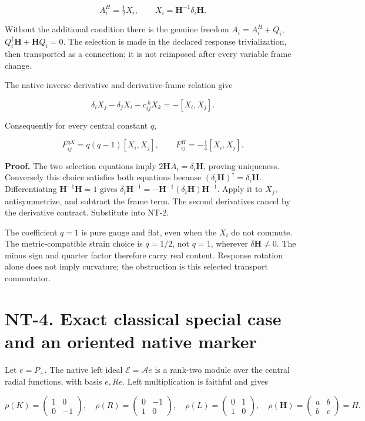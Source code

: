 \documentclass[
  11pt,
]{article}
\begin{document}
\[
\boxed{A_i^H=\tfrac12X_i,\qquad X_i=\mathbf H^{-1}\delta_i\mathbf H.}
\]

Without the additional condition there is the genuine freedom
\(A_i=A_i^H+Q_i\), \(Q_i^\dagger\mathbf H+\mathbf HQ_i=0\). The
selection is made in the declared response trivialization, then
transported as a connection; it is not reimposed after every variable
frame change.

The native inverse derivative and derivative-frame relation give

\[
\delta_iX_j-\delta_jX_i-c_{ij}^{\ k}X_k=-[X_i,X_j].
\]

Consequently for every central constant \(q\),

\[
F^{qX}_{ij}=q(q-1)[X_i,X_j],\qquad
\boxed{F^H_{ij}=-\tfrac14[X_i,X_j].}
\]

\textbf{Proof.} The two selection equations imply
\(2\mathbf HA_i=\delta_i\mathbf H\), proving uniqueness. Conversely this
choice satisfies both equations because
\((\delta_i\mathbf H)^\dagger=\delta_i\mathbf H\). Differentiating
\(\mathbf H^{-1}\mathbf H=1\) gives
\(\delta_i\mathbf H^{-1}=-\mathbf H^{-1}(\delta_i\mathbf H)\mathbf H^{-1}\).
Apply it to \(X_j\), antisymmetrize, and subtract the frame term. The
second derivatives cancel by the derivative contract. Substitute into
NT-2.

The coefficient \(q=1\) is pure gauge and flat, even when the \(X_i\) do
not commute. The metric-compatible strain choice is \(q=1/2\), not
\(q=1\), wherever \(\delta\mathbf H\ne0\). The minus sign and quarter
factor therefore carry real content. Response rotation alone does not
imply curvature; the obstruction is this selected transport commutator.

\hypertarget{nt-4.-exact-classical-special-case-and-an-oriented-native-marker}{%
\section{NT-4. Exact classical special case and an oriented native
marker}\label{nt-4.-exact-classical-special-case-and-an-oriented-native-marker}}

Let \(e=P_+\). The native left ideal \(\mathcal E=\mathcal A e\) is a
rank-two module over the central radial functions, with basis \(e,Re\).
Left multiplication is faithful and gives

\[
\rho(K)=\begin{pmatrix}1&0\\0&-1\end{pmatrix},\quad
\rho(R)=\begin{pmatrix}0&-1\\1&0\end{pmatrix},\quad
\rho(L)=\begin{pmatrix}0&1\\1&0\end{pmatrix},
\quad \rho(\mathbf H)=\begin{pmatrix}a&b\\b&c\end{pmatrix}=H.
\]
\end{document}
